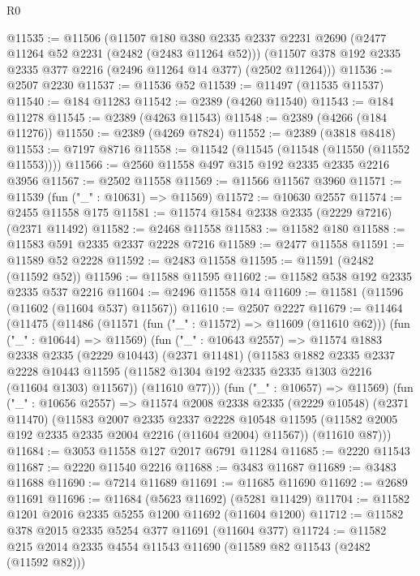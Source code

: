 \begin{lexlean}{R0}
\begin{coremodule}
@11535 := @11506
    (@11507
      @180
      @380
      @2335
      @2337
      @2231
      @2690
      (@2477 @11264 @52 @2231 (@2482 (@2483 @11264 @52)))
      (@11507 @378 @192 @2335 @2335 @377 @2216 (@2496 @11264 @14 @377) (@2502 @11264)))
@11536 := @2507 @2230
@11537 := @11536 @52
@11539 := @11497 (@11535 @11537)
@11540 := @184 @11283
@11542 := @2389 (@4260 @11540)
@11543 := @184 @11278
@11545 := @2389 (@4263 @11543)
@11548 := @2389 (@4266 (@184 @11276))
@11550 := @2389 (@4269 @7824)
@11552 := @2389 (@3818 @8418)
@11553 := @7197 @8716
@11558 := @11542 (@11545 (@11548 (@11550 (@11552 @11553))))
@11566 := @2560 @11558 @497 @315 @192 @2335 @2335 @2216 @3956
@11567 := @2502 @11558
@11569 := @11566 @11567 @3960
@11571 := @11539 (fun ("_" : @10631) => @11569)
@11572 := @10630 @2557
@11574 := @2455 @11558 @175
@11581 := @11574 @1584 @2338 @2335 (@2229 @7216) (@2371 @11492)
@11582 := @2468 @11558
@11583 := @11582 @180
@11588 := @11583 @591 @2335 @2337 @2228 @7216
@11589 := @2477 @11558
@11591 := @11589 @52 @2228
@11592 := @2483 @11558
@11595 := @11591 (@2482 (@11592 @52))
@11596 := @11588 @11595
@11602 := @11582 @538 @192 @2335 @2335 @537 @2216
@11604 := @2496 @11558 @14
@11609 := @11581 (@11596 (@11602 (@11604 @537) @11567))
@11610 := @2507 @2227
@11679 := @11464
    (@11475
      (@11486
        (@11571 (fun ("_" : @11572) => @11609 (@11610 @62)))
        (fun ("_" : @10644) => @11569)
        (fun ("_" : @10643 @2557) =>
        @11574
          @1883
          @2338
          @2335
          (@2229 @10443)
          (@2371 @11481)
          (@11583
            @1882
            @2335
            @2337
            @2228
            @10443
            @11595
            (@11582 @1304 @192 @2335 @2335 @1303 @2216 (@11604 @1303) @11567))
          (@11610 @77)))
      (fun ("_" : @10657) => @11569)
      (fun ("_" : @10656 @2557) =>
      @11574
        @2008
        @2338
        @2335
        (@2229 @10548)
        (@2371 @11470)
        (@11583
          @2007
          @2335
          @2337
          @2228
          @10548
          @11595
          (@11582 @2005 @192 @2335 @2335 @2004 @2216 (@11604 @2004) @11567))
        (@11610 @87)))
@11684 := @3053 @11558 @127 @2017 @6791 @11284
@11685 := @2220 @11543
@11687 := @2220 @11540 @2216
@11688 := @3483 @11687
@11689 := @3483 @11688
@11690 := @7214 @11689
@11691 := @11685 @11690
@11692 := @2689 @11691
@11696 := @11684 (@5623 @11692) (@5281 @11429)
@11704 := @11582 @1201 @2016 @2335 @5255 @1200 @11692 (@11604 @1200)
@11712 := @11582 @378 @2015 @2335 @5254 @377 @11691 (@11604 @377)
@11724 := @11582 @215 @2014 @2335 @4554 @11543 @11690 (@11589 @82 @11543 (@2482 (@11592 @82)))

\end{coremodule}
\end{lexlean}
